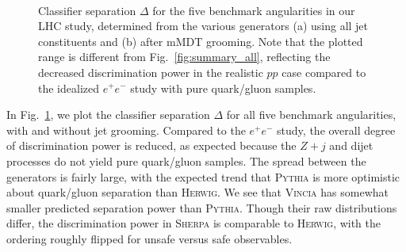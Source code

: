\documentclass[11pt,letterpaper]{article}
\DeclareRobustCommand{\Fig}[1]{Fig.~\ref{#1}}
\begin{document}
\begin{figure}
\centering
{}
$\qquad$
\caption{Classifier separation $\Delta$ for the five benchmark
  angularities in our LHC study, determined from the various
  generators (a) using all jet constituents and (b) after mMDT
  grooming.  Note that the plotted range is different from
  \Fig{fig:summary_all}, reflecting the decreased discrimination
  power in the realistic $pp$ case compared to the idealized $e^+e^-$
  study with pure quark/gluon samples.}
\label{fig:summary_pp_all}
\end{figure}

In \Fig{fig:summary_pp_all}, we plot the classifier separation $\Delta$ for all five benchmark angularities, with and without jet grooming.  Compared to the $e^+e^-$ study, the overall degree of discrimination power is reduced, as expected because the $Z+j$ and dijet processes do not yield pure quark/gluon samples.  The spread between the generators is fairly large, with the expected trend that \textsc{Pythia} is more optimistic about quark/gluon separation than \textsc{Herwig}.  We see that \textsc{Vincia} has somewhat smaller predicted separation power than \textsc{Pythia}.   Though their raw distributions differ, the discrimination power in \textsc{Sherpa} is comparable to \textsc{Herwig}, with the ordering roughly flipped for unsafe versus safe observables.
\end{document}
